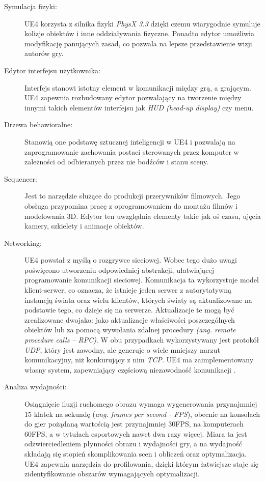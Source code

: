 \documentclass[multip]{SGGW-thesis}
\begin{document}
\begin{description}
\item[Symulacja fizyki:]UE4 korzysta z silnika fizyki {\em PhysX 3.3} dzięki czemu wiarygodnie symuluje kolizje obiektów i inne oddziaływania fizyczne. Ponadto edytor umożliwia modyfikację panujących zasad, co pozwala na lepsze przedstawienie wizji autorów gry.
\item[Edytor interfejsu użytkownika:] Interfejs stanowi istotny element w komunikacji między grą, a grającym. UE4 zapewnia rozbudowany edytor pozwalający na tworzenie między innymi takich elementów interfejsu jak {\em HUD (head-up display)} czy menu.
\item[Drzewa behawioralne:]Stanowią one podstawę sztucznej inteligencji w UE4 i pozwalają na zaprogramowanie zachowania postaci sterowanych przez komputer w zależności od odbieranych przez nie bodźców i stanu sceny.
\item[Sequencer:]Jest to narzędzie służące do produkcji przerywników filmowych. Jego obsługa przypomina pracę z oprogramowaniem do montażu filmów i modelowania 3D. Edytor ten uwzględnia elementy takie jak oś czasu, ujęcia kamery, szkielety i animacje obiektów.
\item[Networking:]UE4 powstał z myślą o rozgrywce sieciowej. Wobec tego dużo uwagi poświęcono utworzeniu odpowiedniej abstrakcji, ułatwiającej programowanie komunikacji sieciowej. Komunikacja ta wykorzystuje model klient-serwer, co oznacza, że istnieje jeden serwer z autorytatywną instancją świata oraz wielu klientów, których światy są aktualizowane na podstawie tego, co dzieje się na serwerze. Aktualizacje te mogą być zrealizowane dwojako: jako aktualizacje właściwości poszczególnych obiektów lub za pomocą wywołania zdalnej procedury {\em (ang. remote procedure calls -- RPC)}. W obu przypadkach wykorzystywany jest protokół {\em UDP}, który jest zawodny, ale generuje o wiele mniejszy narzut komunikacyjny, niż konkurujący z nim {\em TCP}. UE4 ma zaimplementowany własny system, zapewniający częściową niezawodność komunikacji \cite{unreal-wiki-replication}.
\item[Analiza wydajności:]Osiągnięcie iluzji ruchomego obrazu wymaga wygenerowania przynajmniej 15 klatek na sekundę ({\em ang. frames per second - FPS}), obecnie na konsolach do gier pożądaną wartością jest przynajmniej 30FPS, na komputerach 60FPS\cite{docs-profiler}, a w tytułach esportowych nawet dwa razy więcej. Miara ta jest odzwierciedleniem płynności obrazu i wydajności gry, a na wydajność składają się stopień skomplikowania scen i obliczeń oraz optymalizacja. UE4 zapewnia narzędzia do profilowania, dzięki którym łatwiejsze staje się zidentyfikowanie obszarów wymagających optymalizacji.

\end{description}
\end{document}
